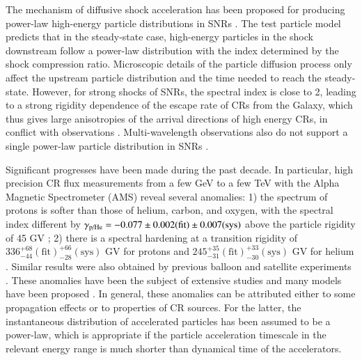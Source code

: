 \documentclass[apj]{emulateapj}
\begin{document}
The mechanism of diffusive shock acceleration has been proposed for producing power-law high-energy particle distributions in SNRs \citep{1983RPPh...46..973D}. The test particle model predicts that in the steady-state case, high-energy particles in the shock downstream follow a power-law distribution with the index determined by the shock compression ratio. Microscopic details of the particle diffusion process only affect the upstream particle distribution and the time needed to reach the steady-state. However, for strong shocks of SNRs, the spectral index is close to 2, leading to a strong rigidity dependence of the escape rate of CRs from the Galaxy, which thus gives large anisotropies of the arrival directions of high energy CRs, in conflict with observations \citep{Hillas05,2017PrPNP..94..184A}. Multi-wavelength observations also do not support a single power-law particle distribution in SNRs \citep{Helder2012,2017ApJ...834..153Z,2017JHEAp..13...17O}.

Significant progresses have been made during the past decade. In particular, high precision CR flux measurements from a few GeV to a few TeV with the Alpha Magnetic Spectrometer (AMS) reveal several anomalies: 1) the spectrum of protons is softer than those of helium, carbon, and oxygen, with the spectral index different by $\gamma _{\textrm{\scriptsize p/He}}=-0.077\pm 0.002(\textrm{fit})\pm 0.007(\textrm{sys}) $ above the particle rigidity of 45 GV \citep{2015PhRvL.115u1101A}; 2) there is a spectral hardening at a transition rigidity of $ 336_{-44}^{+68}(\textrm{fit})_{-28}^{+66}(\textrm{sys}) $ GV for protons \citep{2015PhRvL.114q1103A} and $ 245_{-31}^{+35}(\textrm{fit})_{-30}^{+33}(\textrm{sys}) $ GV for helium \citep{2015PhRvL.115u1101A}. Similar results were also obtained by previous balloon and satellite experiments \citep{2009BRASP..73..564P,2010ApJ...714L..89A,2011Sci...332...69A}. These anomalies have been the subject of extensive studies and many models have been proposed \citep[see][for a review]{Ohira16}. In general, these anomalies can be attributed either to some propagation effects or to properties of CR sources. For the latter, the instantaneous distribution of accelerated particles has been assumed to be a power-law, which is appropriate if the particle acceleration timescale in the relevant energy range is much shorter than dynamical time of the accelerators.
\end{document}
